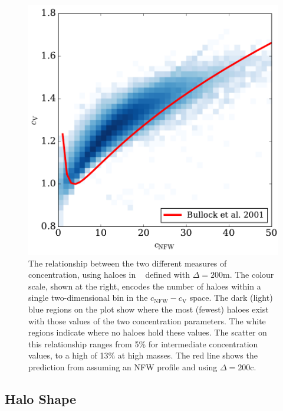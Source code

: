 \documentclass[usenatbib,fleqn]{mnras}
\begin{document}
\begin{figure}
\centering
\includegraphics[width=\columnwidth]{cvvscnfw_relation.pdf}
\caption{
The relationship between the two different measures of concentration, using haloes in \simB~ defined with $\Delta=200$m. The colour scale, shown at the right, encodes the number of haloes within a single two-dimensional bin in the $c_{\mathrm{NFW}}-c_{\mathrm{V}}$ space. The dark (light) blue regions on the plot show where the most (fewest) haloes exist with those values of the two concentration parameters. The white regions indicate where no haloes hold these values. The scatter on this relationship ranges from 5\% for intermediate concentration values, to a high of 13\% at high masses. The red line shows the prediction from \citet{bullock_etal01} assuming an NFW profile and using $\Delta=200$c.}
\label{fig:concentrations}
\end{figure}


\subsection{Halo Shape}
\end{document}
